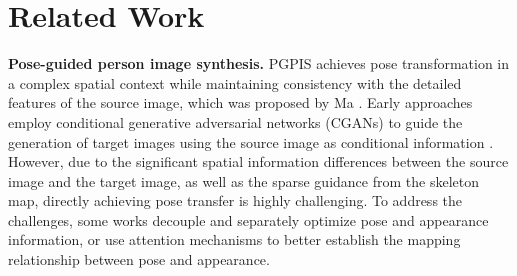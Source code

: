 \section{Related Work}
\label{sec:related_work}

\textbf{Pose-guided person image synthesis.}
PGPIS achieves pose transformation in a complex spatial context while maintaining consistency with the detailed features of the source image, which was proposed by Ma \etal  \cite{ma2017pose}. 
Early approaches \cite{esser2018variational,ma2017pose} employ conditional generative adversarial networks (CGANs)  \cite{goodfellow2014generative, mirza2014conditional} to guide the generation of target images using the source image as conditional information \cite{ma2017pose,men2020controllable}. However, due to the significant spatial information differences between the source image and the target image, as well as the sparse guidance from the skeleton map, directly achieving pose transfer is highly challenging. To address the challenges, some works decouple and separately optimize pose and appearance information\cite{ma2018disentangled}, or use attention mechanisms to better establish the mapping relationship between pose and appearance\cite{ren2022neural,zhang2022exploring,zhou2021cocosnet}. 
